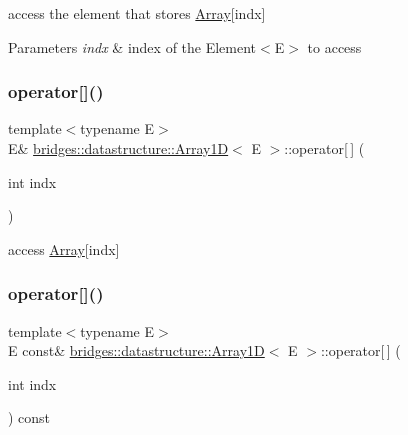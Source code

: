 access the element that stores \mbox{\hyperlink{classbridges_1_1datastructure_1_1_array}{Array}}\mbox{[}indx\mbox{]} 


\begin{DoxyParams}{Parameters}
{\em indx} & index of the Element$<$\+E$>$ to access \\
\hline
\end{DoxyParams}
\mbox{\label{classbridges_1_1datastructure_1_1_array1_d_ac0e28b33231ba865d00dbaf1ad4d1b5b}} 
\subsubsection{\texorpdfstring{operator[]()}{operator[]()}\hspace{0.1cm}{\footnotesize\ttfamily [1/2]}}
{\footnotesize\ttfamily template$<$typename E$>$ \\
E\& \mbox{\hyperlink{classbridges_1_1datastructure_1_1_array1_d}{bridges\+::datastructure\+::\+Array1D}}$<$ E $>$\+::operator\mbox{[}$\,$\mbox{]} (\begin{DoxyParamCaption}\item[{int}]{indx }\end{DoxyParamCaption})\hspace{0.3cm}{\ttfamily [inline]}}



access \mbox{\hyperlink{classbridges_1_1datastructure_1_1_array}{Array}}\mbox{[}indx\mbox{]} 

\mbox{\label{classbridges_1_1datastructure_1_1_array1_d_a3eee632c4ba3bce5694da00f07e1ac65}} 
\subsubsection{\texorpdfstring{operator[]()}{operator[]()}\hspace{0.1cm}{\footnotesize\ttfamily [2/2]}}
{\footnotesize\ttfamily template$<$typename E$>$ \\
E const\& \mbox{\hyperlink{classbridges_1_1datastructure_1_1_array1_d}{bridges\+::datastructure\+::\+Array1D}}$<$ E $>$\+::operator\mbox{[}$\,$\mbox{]} (\begin{DoxyParamCaption}\item[{int}]{indx }\end{DoxyParamCaption}) const\hspace{0.3cm}{\ttfamily [inline]}}



